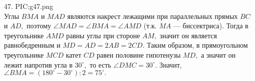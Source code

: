 47. {{PIC:g47.png}}\\
Углы $BMA$ и $MAD$ являются накрест лежащими при параллельных прямых $BC$ и $AD,$ поэтому $\angle MAD=\angle BMA=\angle AMD$ (т.к. $MA$ --- биссектриса). Тогда в треугольнике $AMD$ равны углы при стороне $AM,$ значит он является равнобедренным и $MD=AD=2AB=2CD.$ Таким образом, в прямоугольном треугольнике $MCD$ катет $CD$ равен половине гипотенузы $MD,$ а значит он лежит напротив угла в $30^\circ,$ то есть $\angle DMC=30^\circ.$ Значит, $\angle BMA=(180^\circ-30^\circ):2=75^\circ.$\\
